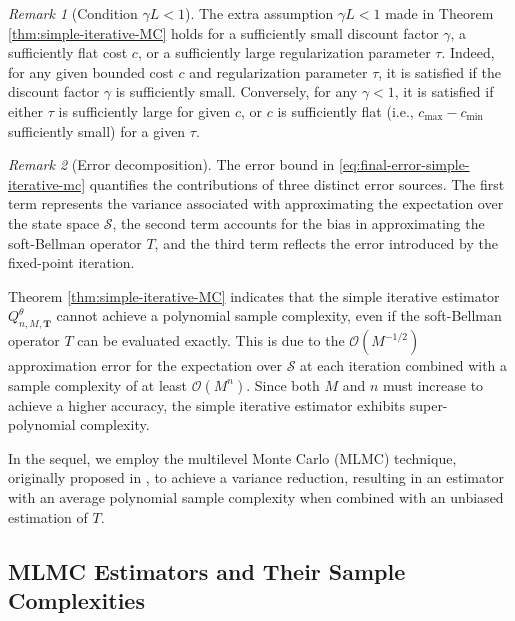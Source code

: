 \documentclass[11pt]{article}
\numberwithin{equation}{section}
\theoremstyle{definition}
\theoremstyle{remark}
\newtheorem{remark}{Remark}[section]
\newcommand{\citet}{\cite}
\begin{document}
 \begin{remark}[Condition $\gamma L <1$]
 \label{rem:gammaL}
The extra assumption $\gamma L <1$ made in Theorem \ref{thm:simple-iterative-MC} 
holds for   
a sufficiently small
discount factor $\gamma$,
a sufficiently flat cost $c$,
or a sufficiently large regularization parameter $\tau$.
Indeed, 
  for any given bounded cost $c$ and regularization parameter $\tau$, it is satisfied if the discount factor $\gamma$ is sufficiently small. Conversely, for any $\gamma<1$, it is satisfied if either $\tau$ is sufficiently large for given $c$, or $c$ is sufficiently flat
(i.e., $c_{\max}-c_{\min}$ sufficiently small) for a given $\tau$. 
  \end{remark}
  
 \begin{remark}[Error decomposition]
  \label{rmk:quasi-polynomial-simple-iterative}  
The error bound in \eqref{eq:final-error-simple-iterative-mc} quantifies the contributions of three distinct error sources. The first term represents the variance associated with approximating the expectation over the state space \( \mathcal{S} \), the second term accounts for the bias in approximating the soft-Bellman operator \( T \), and the third term reflects the error introduced by the fixed-point iteration.


Theorem \ref{thm:simple-iterative-MC} indicates that 
the simple iterative estimator 
${Q}_{n,M,\mathbf T }^\theta$   cannot achieve a polynomial sample complexity, even if the soft-Bellman operator $T$  can be evaluated exactly.
This is due to the \(\mathcal{O}(M^{-1/2})\) approximation error for the expectation over \( \mathcal{S} \) at each iteration combined with a sample complexity of at least \(\mathcal{O}(M^n)\).
Since both 
$M$ and  $n$  must increase to achieve a higher accuracy, the simple iterative estimator exhibits super-polynomial complexity.
 \end{remark}


In the sequel, we employ   the multilevel Monte Carlo (MLMC) technique, originally proposed in \citet{giles2015mlmc}, to achieve a variance reduction, resulting in an estimator with an average polynomial sample complexity when combined with an unbiased estimation of \(T\).



\subsection{MLMC Estimators and Their Sample Complexities} 
\end{document}
